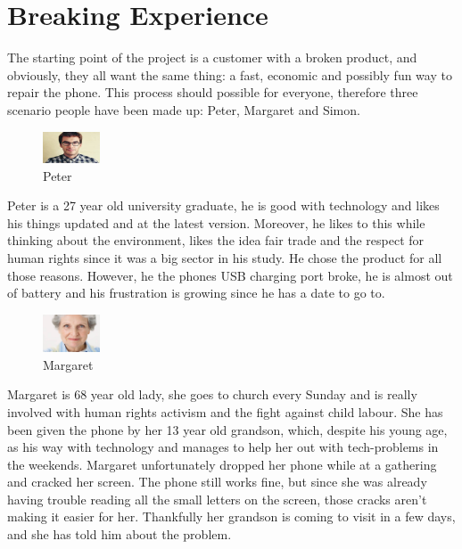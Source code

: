 \documentclass[final]{scrreprt} %
\begin{document}
\chapter{Breaking Experience}%
\label{ch:breaking-experience}
The starting point of the project is a customer with a broken product, and obviously, they all want the same thing: a fast, economic and possibly fun way to repair the phone. This process should possible for everyone, therefore three scenario people have been made up: Peter, Margaret and Simon.

\begin{figure}
	\centering
	\includegraphics[width=0.15\textwidth]{./images/Peter}
	\caption{\label{fig:Peter}Peter}
\end{figure}

Peter is a 27 year old university graduate, he is good with technology and likes his things updated and at the latest version. Moreover, he likes to this while thinking about the environment, likes the idea fair trade and the respect for human rights since it was a big sector in his study. He chose the product for all those reasons. However, he the phones USB charging port broke, he is almost out of battery and his frustration is growing since he has a date to go to. 

\begin{figure}
	\centering
	\includegraphics[width=0.15\textwidth]{./images/Margaret}
	\caption{\label{fig:Margaret}Margaret}
\end{figure}

Margaret is 68 year old lady, she goes to church every Sunday and is really involved with human rights activism and the fight against child labour. She has been given the phone by her 13 year old grandson, which, despite his young age, as his way with technology and manages to help her out with tech-problems in the weekends. Margaret unfortunately dropped her phone while at a gathering and cracked her screen. The phone still works fine, but since she was already having trouble reading all the small letters on the screen, those cracks aren't making it easier for her. Thankfully her grandson is coming to visit in a few days, and she has told him about the problem.
\end{document}
